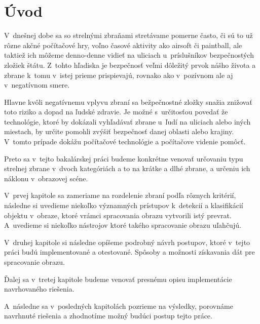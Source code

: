 \chapter{Úvod}
V~dnešnej dobe sa so strelnými zbraňami stretávame pomerne často, či sú to už rôzne akčné počítačové hry,
    voľno časové aktivity ako airsoft či paintball, ale taktiež ich môžeme denno-denne vidieť na uliciach u~príslušníkov bezpečnostých zložiek štátu.
Z~tohto hľadiska je bezpečnosť veľmi dôležitý prvok nášho života a zbrane k~tomu v~istej prieme prispievajú,
    rovnako ako v~pozívnom ale aj v~negatívnom smere.

Hlavne kvôli negatívnemu vplyvu zbraní sa bežpečnostné zložky snažia znižovať toto riziko a dopad na ľudské zdravie.
Je možné s~určitosťou povedať že technológie, ktoré by dokázali vyhľadávať zbrane u~ľudí na uliciach alebo iných miestach,
    by určite pomohli zvýšiť bezpečnosť danej oblasti alebo krajiny.
V~tomto prípade dokážu počítačové technológie a počítačove videnie pomôcť.

Preto sa v~tejto bakalárskej práci budeme konkrétne venovať určovaniu typu strelnej zbrane v~dvoch kategóriách a to na
    krátke a dlhé zbrane, a určeniu ich náklonu v~obrazovej scéne.

V~prvej kapitole sa zameriame na rozdelenie zbraní podľa rôznych kritérií, následne si uvedieme niekoľko
    významných prístupov k~detekcií a klasifikácií objektu v~obraze, ktoré vrámci spracovania obrazu vytvorili istý prevrat.
A~uvedieme si niekoľko nástrojov ktoré takého spracovanie obrazu uľahčujú.

V~druhej kapitole si následne opíšeme podrobný návrh postupov, ktoré v~tejto práci budú implementované a otestované.
Spôsoby a možnosti získavania dát pre spracovanie obrazu.

Ďalej sa v~tretej kapitole budeme venovať presnému opisu implementácie navrhovaného riešenia.

A~následne sa v~posledných kapitolách pozrieme na výsledky, porovnáme navrhnuté riešenia a zhodnotíme možný budúci postup tejto práce.
